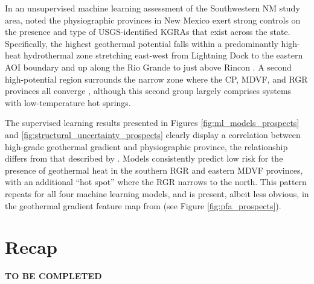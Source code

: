 In an unsupervised machine learning assessment of the Southwestern NM study area, \citet{pepin_new_2019} noted the physiographic provinces in New Mexico exert strong controls on the presence and type of USGS-identified KGRAs that exist across the state. Specifically, the  highest geothermal potential falls within a predominantly high-heat hydrothermal zone stretching east-west from Lightning Dock to the eastern AOI boundary and up along the Rio Grande to just above Rincon \citep[Figure 3.5A]{pepin_new_2019}. A second high-potential region surrounds the narrow zone where the CP, MDVF, and RGR provinces all converge \citep[Figure 3.5C]{pepin_new_2019}, although this second group largely comprises systems with low-temperature hot springs. 

The supervised learning results presented in Figures \ref{fig:ml_models_prospects} and \ref{fig:structural_uncertainty_prospects} clearly display a correlation between high-grade geothermal gradient and physiographic province, the relationship differs from that described by \citet{pepin_new_2019}. Models consistently predict low risk for the presence of geothermal heat in the southern RGR and eastern MDVF provinces, with an additional ``hot spot'' where the RGR narrows to the north. This pattern repeats for all four machine learning models, and is present, albeit less obvious, in the geothermal gradient feature map from \citet{bielicki_hydrogeolgic_2015} (see Figure \ref{fig:pfa_prospects}). 



\section{Recap}\label{ch5:recap}
\textbf{TO BE COMPLETED}




